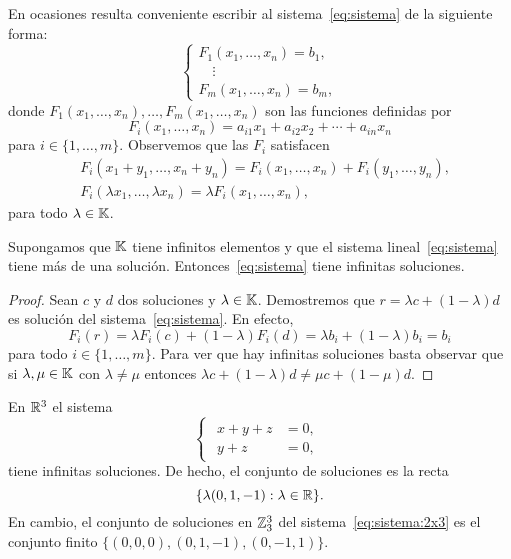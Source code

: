 \begin{block}
	En ocasiones resulta conveniente escribir al sistema~\eqref{eq:sistema} de
	la siguiente forma:
	\begin{equation}
		\begin{cases}	
			F_1(x_1,\dots,x_n)=b_1,\\
			\quad\vdots\\
			F_m(x_1,\dots,x_n)=b_m,
		\end{cases}
	\end{equation}
	donde $F_1(x_1,\dots,x_n),\dots,F_m(x_1,\dots,x_n)$ son las funciones 
	definidas por 
	\[
	F_i(x_1,\dots,x_n)=a_{i1}x_1+a_{i2}x_2+\cdots+a_{in}x_n
	\]
	para $i\in\{1,\dots,m\}$. Observemos que las $F_i$ satisfacen 
	\begin{align*}
		& F_i(x_1+y_1,\dots,x_n+y_n)=F_i(x_1,\dots,x_n)+F_i(y_1,\dots,y_n),\\
		& F_i(\lambda x_1,\dots,\lambda x_n)=\lambda F_i(x_1,\dots,x_n),
	\end{align*}
	para todo $\lambda\in\mathbb{K}$.
\end{block}

\begin{prop}
    Supongamos que $\mathbb{K}$ tiene infinitos elementos y que el sistema
    lineal~\eqref{eq:sistema} tiene más de una solución.
    Entonces~\eqref{eq:sistema} tiene infinitas soluciones.

	\begin{proof}
        Sean $c$ y $d$ dos soluciones y $\lambda\in\mathbb{K}$. Demostremos que $r=\lambda
        c+(1-\lambda)d$ es solución del sistema~\eqref{eq:sistema}. En efecto, 
		\[
			F_i(r)=\lambda F_i(c)+(1-\lambda)F_i(d)=\lambda b_i+(1-\lambda)b_i=b_i
		\]
		para todo $i\in\{1,\dots,m\}$. Para ver que hay infinitas soluciones
		basta observar que si $\lambda,\mu\in\mathbb{K}$ con $\lambda\ne\mu$ entonces
		$\lambda c+(1-\lambda)d\ne \mu c+(1-\mu)d$.
	\end{proof}
\end{prop}

\begin{example}
	En $\mathbb{R}^3$ el sistema
	\begin{equation}
		\label{eq:sistema:2x3}
		\begin{cases}
			\begin{aligned}
				x+y+z &= 0,\\
				y+z &= 0,
			\end{aligned}
		\end{cases}
	\end{equation}
	tiene infinitas soluciones. De hecho, el conjunto de soluciones es la recta 
	\[
		\{\lambda(0,1,-1): \lambda\in\mathbb{R}\}.
	\]
	En cambio, el conjunto de soluciones en $\mathbb{Z}_3^3$ del
	sistema~\eqref{eq:sistema:2x3} es el conjunto finito
	$\{(0,0,0),(0,1,-1),(0,-1,1)\}$. 
\end{example}

